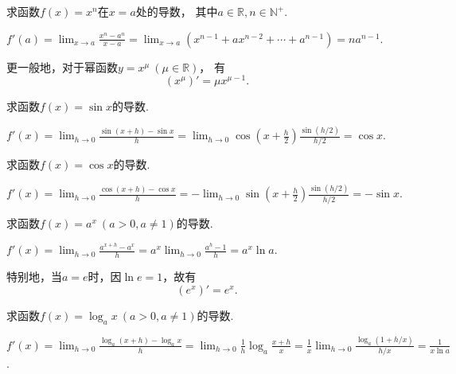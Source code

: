 \begin{example}%
求函数\(f(x) = x^n\)在\(x=a\)处的导数，
其中\(a\in\mathbb{R},
n\in\mathbb{N}^+\).
\begin{solution}
\(f'(a)
= \lim_{x \to a} \frac{x^n-a^n}{x-a}
= \lim_{x \to a} (x^{n-1}+ax^{n-2}+\dotsb+a^{n-1})
= na^{n-1}\).
\end{solution}
\end{example}

更一般地，对于幂函数\(y=x^{\mu}\ (\mu\in\mathbb{R})\)，
有\begin{equation}
	(x^{\mu})' = \mu x^{\mu-1}.
\end{equation}

\begin{example}%
求函数\(f(x) = \sin x\)的导数.
\begin{solution}
\(f'(x) = \lim_{h\to0} \frac{\sin(x+h)-\sin x}{h}
= \lim_{h\to0} \cos(x+\frac{h}{2}) \frac{\sin(h/2)}{h/2}
= \cos x\).
\end{solution}
\end{example}

\begin{example}%
求函数\(f(x) = \cos x\)的导数.
\begin{solution}
\(f'(x) = \lim_{h\to0} \frac{\cos(x+h)-\cos x}{h}
= - \lim_{h\to0} \sin\left(x+\frac{h}2\right) \frac{\sin(h/2)}{h/2}
= - \sin x\).
\end{solution}
\end{example}

\begin{example}%
求函数\(f(x) = a^x\ (a>0,a\neq1)\)的导数.
\begin{solution}
\(f'(x)
= \lim_{h\to0}\frac{a^{x+h}-a^x}{h}
= a^x \lim_{h\to0}\frac{a^h-1}{h}
= a^x \ln a\).
\end{solution}
\end{example}
\begin{remark}
特别地，当\(a=e\)时，因\(\ln e = 1\)，故有\[
	(e^x)' = e^x.
\]
\end{remark}

\begin{example}%
求函数\(f(x) = \log_a x\ (a>0,a\neq1)\)的导数.
\begin{solution}
\(f'(x)
= \lim_{h\to0}\frac{\log_a(x+h)-\log_a x}{h}
= \lim_{h\to0}{\frac{1}{h} \log_a\frac{x+h}{x}}
= \frac{1}{x} \lim_{h\to0}\frac{\log_a(1+h/x)}{h/x}
= \frac{1}{x \ln a}\).
\end{solution}
\end{example}

